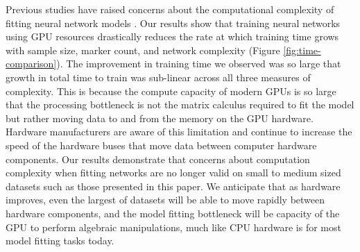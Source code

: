 Previous studies have raised concerns about the computational complexity of fitting
neural network models \citep{heslot2012,gonzalez-recio2014}. Our results show
that training neural networks using GPU resources drastically
reduces the rate at which training time grows with sample size, marker count,
and network complexity (Figure \ref{fig:time-comparison}). The improvement in 
training time we observed was so large that growth in total time to train was sub-linear
across all three measures of complexity. This is because the compute capacity 
of modern GPUs is so large that the processing bottleneck is not the matrix calculus
required to fit the model but rather moving data to and from the memory on 
the GPU hardware. Hardware manufacturers are aware of this limitation 
and continue to increase the speed of the hardware 
buses that move data between computer hardware components. Our results
demonstrate that concerns about computation complexity when fitting 
networks are no longer valid on small to medium sized datasets such as 
those presented in this paper. We anticipate that as hardware improves, 
even the largest of datasets will be able to move rapidly between hardware components, 
and the model fitting bottleneck will be capacity of the
GPU to perform algebraic manipulations, much like CPU hardware is for most 
model fitting tasks today.

